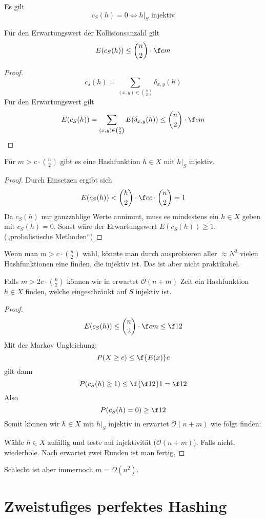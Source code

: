 \documentclass{mycourse}
\renewcommand{\O}{\mathcal{O}}
\begin{document}
Es gilt
\[
	c_S(h) = 0 \iff h\Big|_S \text{ injektiv}
\]

\begin{st}
	Für den Erwartungswert der Kollisionsanzahl gilt
	\[
		E(c_S(h)) \le \binom{n}2 \cdot \f cm
	\]
	\begin{proof}
		\[
			c_s(h) = \sum_{(x,y)\in \binom{S}{2}}\delta_{x,y}(h)
		\]
		Für den Erwartungswert gilt
		\[
			E(c_S(h)) = \sum_{(x,y)\in \binom S2}E(\delta_{x,y}(h)) \le \binom n2 \cdot \f cm
		\]		
	\end{proof}
\end{st}

\begin{kor}
	Für $m>c\cdot \binom n2$ gibt es eine Hashfunktion $h\in X$ mit $h\big|_S$ injektiv.
	\begin{proof}
		Durch Einsetzen ergibt sich
		\[
			E(c_S(h)) < \binom h2 \cdot \f c {c\cdot \binom n2} = 1
		\]
		Da $c_S(h)$ nur ganzzahlige Werte annimmt, muss es mindestens ein $h\in X$ geben mit $c_S(h) = 0$.
		Sonst wäre der Erwartungswert $E(c_S(h)) \ge 1$.
		(„probalistische Methoden“)
	\end{proof}
\end{kor}

Wenn man $m>c\cdot \binom n2$ wähl, könnte man durch ausprobieren aller $\approx N^2$ vielen Hashfunktionen eine finden, die injektiv ist.
Das ist aber nicht praktikabel.

\begin{kor}
	Falls $m > 2c\cdot \binom n2$ können wir in erwartet $\O(n+m)$ Zeit ein Hashfunktion $h\in X$ finden, welche eingeschränkt auf $S$ injektiv ist.
	\begin{proof}
		\[
			E(c_S(h)) \le \binom n2 \cdot \f cm \le \f 12
		\]
		Mit der Markov Ungleichung:
		\[
			P(X\ge c) \le \f{E(x)}c
		\]
		gilt dann
		\[
			P(c_S(h) \ge 1) \le \f{\f 12}1 = \f 12
		\]
		Also
		\[
			P(c_S(h)=0) \ge \f 12
		\]
		Somit können wir $h\in X$ mit $h\big|_S$ injektiv in erwartet $\O(n+m)$ wie folgt finden:

		Wähle $h\in X$ zufällig und teste auf injektivität ($\O(n+m)$).
		Falls nicht, wiederhole.
		Nach erwartet zwei Runden ist man fertig.
	\end{proof}
\end{kor}

Schlecht ist aber immernoch $m=\Omega(n^2)$.


\section{Zweistufiges perfektes Hashing}
\end{document}

